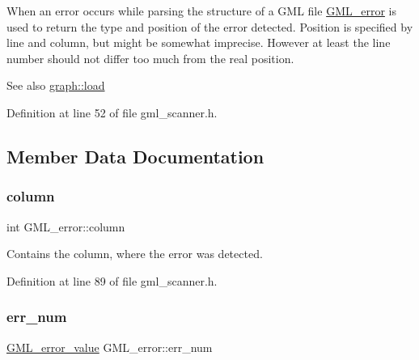 When an error occurs while parsing the structure of a G\+ML file {\ttfamily \mbox{\hyperlink{struct_g_m_l__error}{G\+M\+L\+\_\+error}}} is used to return the type and position of the error detected. Position is specified by {\ttfamily line} and {\ttfamily column}, but might be somewhat imprecise. However at least the line number should not differ too much from the real position.

\begin{DoxySeeAlso}{See also}
\mbox{\hyperlink{classgraph_ac28cb3468623a480709d3329033d4ec8}{graph\+::load}} 
\end{DoxySeeAlso}


Definition at line 52 of file gml\+\_\+scanner.\+h.



\subsection{Member Data Documentation}
\mbox{\label{struct_g_m_l__error_a0708757bcd78a82077a0577982f2c433}} 
\subsubsection{\texorpdfstring{column}{column}}
{\footnotesize\ttfamily int G\+M\+L\+\_\+error\+::column}

Contains the column, where the error was detected. 

Definition at line 89 of file gml\+\_\+scanner.\+h.

\mbox{\label{struct_g_m_l__error_a66fe2c5a3d2d40e77ff486007dfe7f76}} 
\subsubsection{\texorpdfstring{err\+\_\+num}{err\_num}}
{\footnotesize\ttfamily \mbox{\hyperlink{gml__scanner_8h_aabc90afcb30e75bca3bd9969ce74790c}{G\+M\+L\+\_\+error\+\_\+value}} G\+M\+L\+\_\+error\+::err\+\_\+num}

